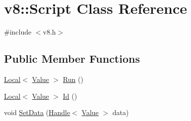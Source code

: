 \hypertarget{classv8_1_1_script}{}\section{v8\+:\+:Script Class Reference}
\label{classv8_1_1_script}


{\ttfamily \#include $<$v8.\+h$>$}

\subsection*{Public Member Functions}
\begin{DoxyCompactItemize}
\item 
\hyperlink{classv8_1_1_local}{Local}$<$ \hyperlink{classv8_1_1_value}{Value} $>$ \hyperlink{classv8_1_1_script_a5f43b29d40bd51ebad2cc275ba3898a1}{Run} ()
\item 
\hyperlink{classv8_1_1_local}{Local}$<$ \hyperlink{classv8_1_1_value}{Value} $>$ \hyperlink{classv8_1_1_script_aa25adfbb98af9179b4891e09432c2916}{Id} ()
\item 
void \hyperlink{classv8_1_1_script_a92d2d9fe3ce03316fc1433b6e4368b5d}{Set\+Data} (\hyperlink{classv8_1_1_handle}{Handle}$<$ \hyperlink{classv8_1_1_value}{Value} $>$ data)
\end{DoxyCompactItemize}

